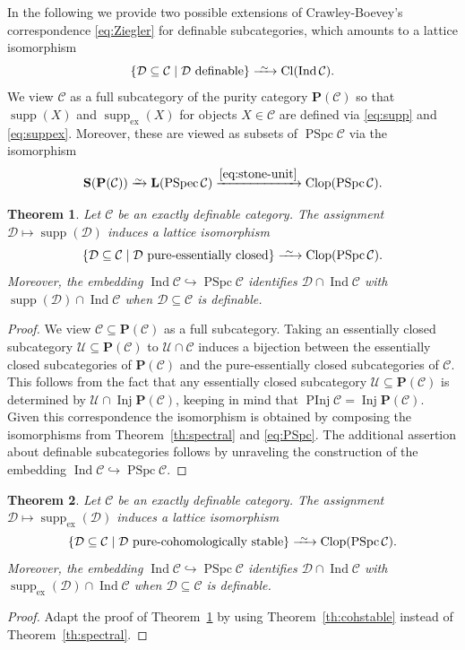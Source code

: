 \documentclass[a4paper]{amsart}
\theoremstyle{plain}
\newtheorem{thm}{Theorem}[section]
\theoremstyle{definition}
\theoremstyle{remark}
\numberwithin{equation}{section}
\newcommand{\Cl}{\operatorname{Cl}}
\newcommand{\Clop}{\operatorname{Clop}}
\newcommand{\Ind}{\operatorname{Ind}}
\newcommand{\Inj}{\operatorname{Inj}}
\newcommand{\PInj}{\operatorname{PInj}}
\newcommand{\PSpc}{\operatorname{PSpc}}
\newcommand{\PSpec}{\operatorname{PSpec}}
\newcommand{\supp}{\operatorname{supp}}
\newcommand{\suppex}{\operatorname{supp}_{\mathrm{ex}}}
\newcommand{\iso}{\xrightarrow{\raisebox{-.4ex}[0ex][0ex]{$\scriptstyle{\sim}$}}}
\newcommand{\longiso}{\xrightarrow{\ \raisebox{-.4ex}[0ex][0ex]{$\scriptstyle{\sim}$}\ }}
\newcommand{\xto}{\xrightarrow}
\def\C{\mathcal C}
\def\D{\mathcal D}
\def\U{\mathcal U}
\def\bfL{\mathbf L}
\def\bfP{\mathbf P}
\def\bfS{\mathbf S}
\begin{document}
In the following we provide two possible extensions of
Crawley-Boevey's correspondence \eqref{eq:Ziegler} for definable
subcategories, which amounts to a lattice isomorphism
  \[ \{\D\subseteq\C\mid\D\text{ definable}\}\longiso\Cl(\Ind\C).\]
We view $\C$ as a full subcategory of the purity
category $\bfP(\C)$ so that $\supp(X)$ and $\suppex(X)$ for objects
$X\in\C$ are defined via \eqref{eq:supp} and
\eqref{eq:suppex}. Moreover, these are viewed as subsets of $\PSpc\C$
via the isomorphism
\begin{equation}\label{eq:PSpc}
  \bfS(\bfP(\C))\iso\bfL(\PSpec\C)\xto{\eqref{eq:stone-unit}} \Clop(\PSpc\C).
\end{equation}

\begin{thm}\label{th:pure-spectral}
  Let $\C$ be an exactly definable category.  The assignment $\D\mapsto\supp(\D)$
  induces a lattice isomorphism
  \[ \{\D\subseteq\C\mid\D\text{ pure-essentially closed}\}\longiso\Clop(\PSpc\C).\] Moreover, the embedding
  $\Ind\C\hookrightarrow\PSpc\C$ identifies $\D\cap\Ind\C$ with
  $\supp(\D)\cap\Ind\C$ when $\D\subseteq\C$ is definable.
\end{thm}
\begin{proof}
  We view $\C\subseteq\bfP(\C)$ as a full subcategory. Taking an
  essentially closed subcategory $\U\subseteq\bfP(\C)$ to $\U\cap\C$ induces a
  bijection between the essentially closed subcategories of $\bfP(\C)$ and the
  pure-essentially closed subcategories of $\C$. This follows from the fact that
  any essentially closed subcategory $\U\subseteq\bfP(\C)$ is determined by
  $\U\cap \Inj\bfP(\C)$, keeping in mind that
  $\PInj\C=\Inj\bfP(\C)$. Given this correspondence the isomorphism is
  obtained by composing the isomorphisms from
  Theorem~\ref{th:spectral} and \eqref{eq:PSpc}. The additional
  assertion about definable subcategories follows by unraveling the
  construction of the embedding $\Ind\C\hookrightarrow\PSpc\C$.
\end{proof}  

\begin{thm}\label{th:pure-stable}
  Let $\C$ be an exactly definable category.  The assignment
  $\D\mapsto\suppex(\D)$  induces a
  lattice isomorphism
  \[ \{\D\subseteq\C\mid\D\text{ pure-cohomologically stable}\}\longiso\Clop(\PSpc\C).\] Moreover, the embedding
  $\Ind\C\hookrightarrow\PSpc\C$ identifies $\D\cap\Ind\C$ with
  $\suppex(\D)\cap\Ind\C$ when $\D\subseteq\C$ is definable. 
\end{thm}
\begin{proof}
Adapt the proof of Theorem~\ref{th:pure-spectral} by using
Theorem~\ref{th:cohstable} instead of Theorem~\ref{th:spectral}.
\end{proof}
\end{document}
